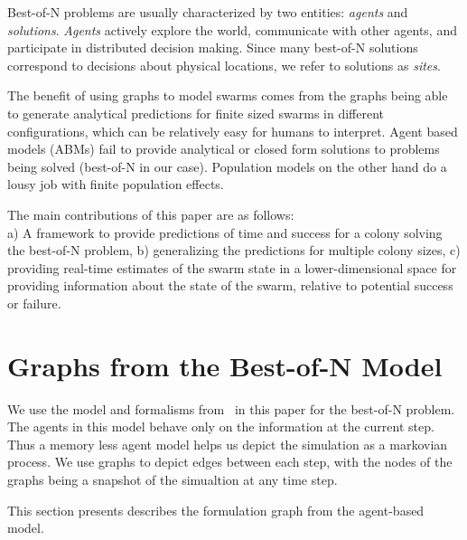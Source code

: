 \documentclass[openacc]{rsproca_new}%
\begin{document}
Best-of-N problems are usually characterized by two  entities: \textit{agents} and \textit{solutions}.  \textit{Agents} actively explore the world, communicate with other agents, and participate in distributed decision making.  Since many best-of-N solutions correspond to decisions about physical locations, we refer to solutions as \textit{sites}.

The benefit of using graphs to model swarms comes from the graphs being able to generate analytical predictions for finite sized swarms in different configurations, which can be relatively easy for humans to interpret. Agent based models (ABMs) fail to provide analytical or closed form solutions to problems being solved (best-of-N in our case). Population models on the other hand do a lousy job with finite population effects.


The main contributions of this paper are as follows: \\ a) A framework to provide predictions of time and success for a colony solving the best-of-N problem, b) generalizing the predictions for multiple colony sizes, c) providing real-time estimates of the swarm state in a lower-dimensional space for providing information about the state of the swarm, relative to potential success or failure.




\maketitle

\section{Graphs from the Best-of-N Model}
We use the model and formalisms from~\cite{} in this paper for the best-of-N problem. The agents in this model behave only on the information at the current step. Thus a memory less agent model helps us depict the simulation as a markovian process. We use graphs to depict edges between each step, with the nodes of the graphs being a snapshot of the simualtion at any time step. 

This section presents describes the formulation graph from the agent-based model.
\end{document}
